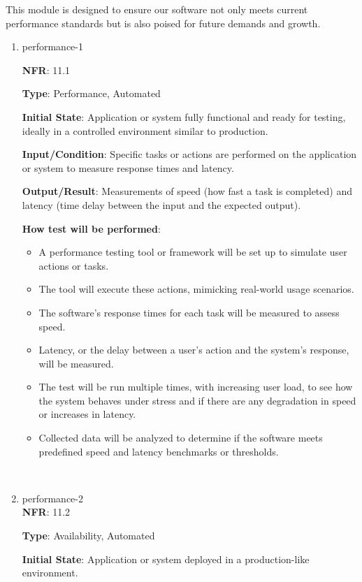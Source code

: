 \documentclass[12pt, titlepage]{article}
\begin{document}
This module is designed to ensure our software not only meets current performance standards but is also poised for future demands and growth.


\begin{enumerate}

\item{performance-1\\}

\textbf{NFR}: 11.1

\textbf{Type}: Performance, Automated

\textbf{Initial State}: Application or system fully functional and ready for testing, ideally in a controlled environment similar to production.

\textbf{Input/Condition}: Specific tasks or actions are performed on the application or system to measure response times and latency.

\textbf{Output/Result}: Measurements of speed (how fast a task is completed) and latency (time delay between the input and the expected output).

\textbf{How test will be performed}: 
\begin{itemize}[noitemsep]
    \item A performance testing tool or framework will be set up to simulate user actions or tasks.
    \item The tool will execute these actions, mimicking real-world usage scenarios.
    \item The software's response times for each task will be measured to assess speed.
    \item Latency, or the delay between a user's action and the system's response, will be measured.
    \item The test will be run multiple times, with increasing user load, to see how the system behaves under stress and if there are any degradation in speed or increases in latency.
    \item Collected data will be analyzed to determine if the software meets predefined speed and latency benchmarks or thresholds.
\end{itemize}\\

\item{performance-2 \\}
\textbf{NFR}: 11.2

\textbf{Type}: Availability, Automated

\textbf{Initial State}: Application or system deployed in a production-like environment.


\end{enumerate}
\end{document}
